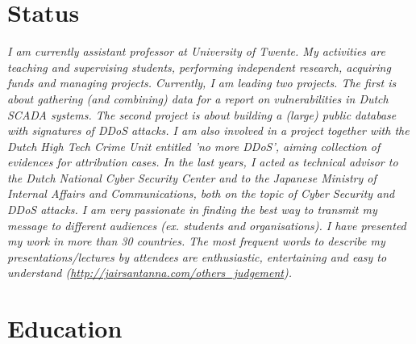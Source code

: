 \documentclass[print]{styles/friggeri-cv-mac} %
\begin{document}
\section{Status}\vspace{-10pt}
\noindent\setlength\parindent{12pt}\textit{
	I am currently assistant professor at University of Twente. My activities are teaching and supervising students, performing independent research, acquiring funds and managing projects. Currently, I am leading two projects. The first is about gathering (and combining) data for a report on vulnerabilities in Dutch SCADA systems. The second project is about building a (large) public database with signatures of DDoS attacks. I am also involved in a project together with the Dutch High Tech Crime Unit entitled 'no more DDoS', aiming collection of evidences for attribution cases. In the last years, I acted as technical advisor to the Dutch National Cyber Security Center and to the Japanese Ministry of Internal Affairs and Communications, both on the topic of Cyber Security and DDoS attacks. 
	I am very passionate in finding the best way to transmit my message to different audiences (ex. students and organisations). I have presented my work in more than 30 countries. The most frequent words to describe my presentations/lectures by attendees are enthusiastic, entertaining and easy to understand (\url{http://jairsantanna.com/others_judgement}). 
}



\setlength\parindent{0pt}
\section{Education}\vspace{-5pt}
\end{document}
